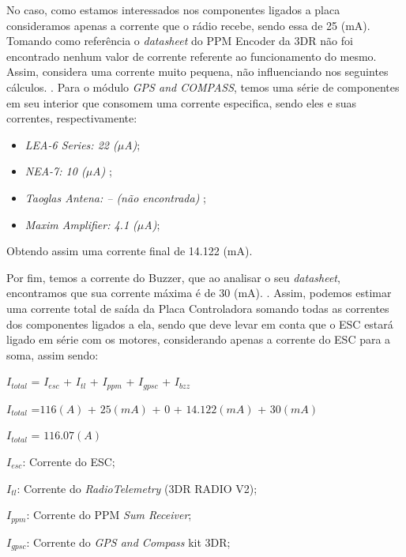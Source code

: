 	No caso, como estamos interessados nos componentes ligados a placa consideramos apenas a corrente que o rádio recebe, sendo essa de 25 (mA).
	Tomando como referência o \textit{datasheet} do PPM Encoder da 3DR não foi encontrado nenhum valor de corrente referente ao funcionamento do mesmo. Assim, considera uma corrente muito pequena, não influenciando nos seguintes cálculos. \cite{enconder}.
	Para o módulo \textit{GPS and COMPASS}, temos uma série de componentes em seu interior que consomem uma corrente especifica, sendo eles e suas correntes, respectivamente: 

	 \begin{itemize}
		\item \textit{LEA-6 Series: 22 ($\mu$A)}\cite{product};
		
		\item \textit{NEA-7: 10 ($\mu$A)} \cite{datasheet};
		
		\item \textit{Taoglas Antena: -- (não encontrada)} \cite{antena2};
		
		\item \textit{Maxim Amplifier: 4.1 ($\mu$A)}\cite{maximin};
	\end{itemize}		
	Obtendo assim uma corrente final de 14.122 (mA).

Por fim, temos a corrente do Buzzer, que ao analisar o seu \textit{datasheet}, encontramos que sua corrente máxima é de 30 (mA). \cite{felcodis}.
	Assim, podemos estimar uma corrente total de saída da Placa Controladora somando todas as correntes dos componentes ligados a ela, sendo que deve levar em conta que o ESC estará ligado em série com os motores, considerando apenas a corrente do ESC para a soma, assim sendo: 

	\begin{center}

		$I_{total}$ = $I_{esc}$ + $I_{tl}$ + $I_{ppm}$ + $I_{gpsc}$ + $I_{bzz}$

		$I_{total}$ =$116 (A)$ + $25 (mA)$ + 0 + $14.122 (mA)$ + $30 (mA)$

		$I_{total}$ = $116.07 (A)$

	\end{center}
	
\indent $I_{esc}$: Corrente do ESC;

\indent $I_{tl}$: Corrente do \textit{RadioTelemetry} (3DR RADIO V2);

\indent $I_{ppm}$: Corrente do PPM \textit{Sum Receiver};

\indent $I_{gpsc}$: Corrente do \textit{GPS and Compass} kit 3DR;

